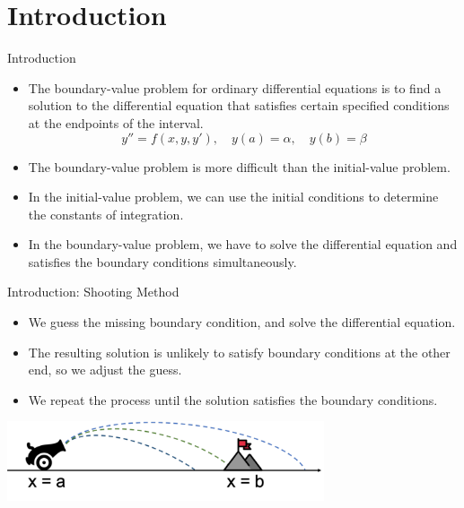 \documentclass{beamer}
\begin{document}
\section[Introduction]{Introduction}
\begin{frame}{Introduction}
\begin{itemize}
    \item The boundary-value problem for ordinary differential equations is to find a solution 
    to the differential equation that satisfies certain specified conditions at the 
    endpoints of the interval.
    \[
    y'' = f(x, y, y'), \quad y(a) = \alpha, \quad y(b) = \beta
    \]
    \item The boundary-value problem is more difficult than the initial-value problem.
    \item In the initial-value problem, we can use the initial conditions to determine 
    the constants of integration.
    \item In the boundary-value problem, we have to solve the differential equation and satisfies 
    the boundary conditions simultaneously.
\end{itemize}
\end{frame}
\begin{frame}{Introduction: Shooting Method}

    \begin{itemize}
        \item We guess the missing boundary condition, and solve the differential equation.
        \item The resulting solution is unlikely to satisfy boundary conditions at the other end, so we adjust the guess.
        \item We repeat the process until the solution satisfies the boundary conditions.

    \end{itemize}
    \vspace{1cm}
    \centerline{\includegraphics[width=0.7\textwidth]{ShootingMethodCartoon.pdf}}
\end{frame}
\end{document}
